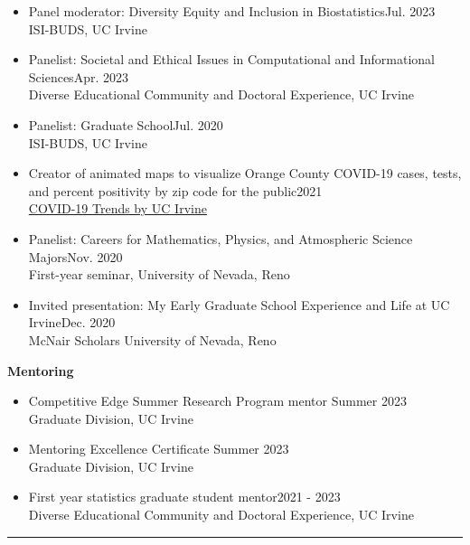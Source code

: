 \documentclass{article}
\begin{document}
\begin{description}
\begin{itemize}
			\item Panel moderator: Diversity Equity and Inclusion in Biostatistics\hfill{Jul. 2023}\\
			ISI-BUDS, UC Irvine
			
			\item Panelist: Societal and Ethical Issues in Computational and Informational Sciences\hfill{Apr. 2023}\\ 
			Diverse Educational Community and Doctoral Experience, UC Irvine %
			
			\item Panelist: Graduate School\hfill{Jul. 2020}\\
			ISI-BUDS, UC Irvine
			
			\item Creator of animated maps to visualize Orange County COVID-19 cases, tests, and percent positivity by zip code for the public\hfill{2021}\\ %
			\href{https://www.stat.uci.edu/covid19/index.html}{COVID-19 Trends by UC Irvine}
			
			\item Panelist: Careers for Mathematics, Physics, and Atmospheric Science Majors\hfill{Nov. 2020}\\ %
			First-year seminar, University of Nevada, Reno
			
			\item Invited presentation: My Early Graduate School Experience and Life at UC Irvine\hfill{Dec. 2020}\\
			McNair Scholars University of Nevada, Reno %
		\end{itemize}
		
		\textbf{Mentoring}
		\begin{itemize}
			\item Competitive Edge Summer Research Program mentor \hfill{Summer 2023}\\
			Graduate Division, UC Irvine 
			
			\item Mentoring Excellence Certificate \hfill{Summer 2023}\\
			Graduate Division, UC Irvine
			
			\item First year statistics graduate student mentor\hfill{2021 - 2023}\\
			Diverse Educational Community and Doctoral Experience, UC Irvine
		\end{itemize}
		
	\end{description}
	\vspace{-2mm}
	\rule{\linewidth}{1pt}
	
\end{document}
